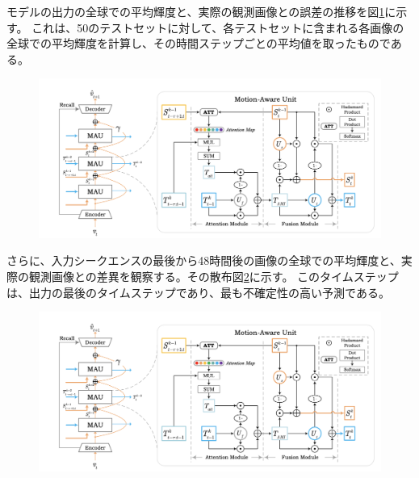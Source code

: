         モデルの出力の全球での平均輝度と、実際の観測画像との誤差の推移を図\ref{fig:exp1_mean_intensity_line}に示す。
        これは、50のテストセットに対して、各テストセットに含まれる各画像の全球での平均輝度を計算し、その時間ステップごとの平均値を取ったものである。

        \begin{figure}[h]
          \centering
          \includegraphics[width=150mm]{figures/mau.png}
          \caption{}
          \label{fig:exp1_mean_intensity_line}
        \end{figure}
        
        さらに、入力シークエンスの最後から48時間後の画像の全球での平均輝度と、実際の観測画像との差異を観察する。その散布図\ref{fig:exp1_mean_intensity_scatter}に示す。
        このタイムステップは、出力の最後のタイムステップであり、最も不確定性の高い予測である。

        \begin{figure}[h]
          \centering
          \includegraphics[width=150mm]{figures/mau.png}
          \caption{}
          \label{fig:exp1_mean_intensity_scatter}
        \end{figure}




